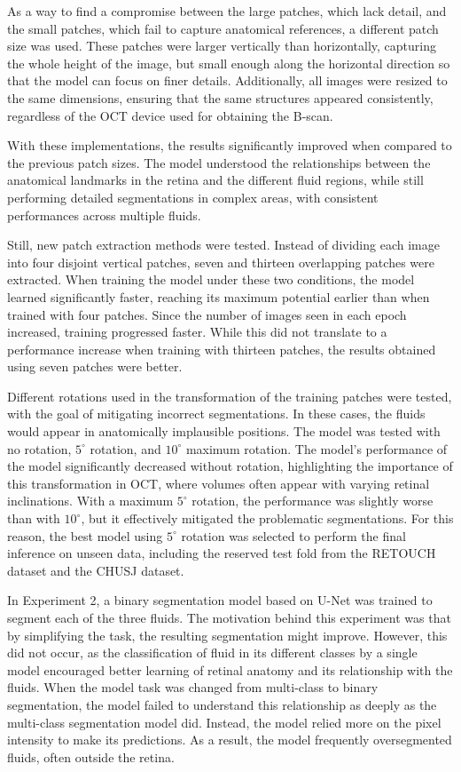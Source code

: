 \par
As a way to find a compromise between the large patches, which lack detail, and the small patches, which fail to capture anatomical references, a different patch size was used. These patches were larger vertically than horizontally, capturing the whole height of the image, but small enough along the horizontal direction so that the model can focus on finer details. Additionally, all images were resized to the same dimensions, ensuring that the same structures appeared consistently, regardless of the OCT device used for obtaining the B-scan.
\par
With these implementations, the results significantly improved when compared to the previous patch sizes. The model understood the relationships between the anatomical landmarks in the retina and the different fluid regions, while still performing detailed segmentations in complex areas, with consistent performances across multiple fluids.
\par
Still, new patch extraction methods were tested. Instead of dividing each image into four disjoint vertical patches, seven and thirteen overlapping patches were extracted. When training the model under these two conditions, the model learned significantly faster, reaching its maximum potential earlier than when trained with four patches. Since the number of images seen in each epoch increased, training progressed faster. While this did not translate to a performance increase when training with thirteen patches, the results obtained using seven patches were better.
\par
Different rotations used in the transformation of the training patches were tested, with the goal of mitigating incorrect segmentations. In these cases, the fluids would appear in anatomically implausible positions. The model was tested with no rotation, $5^{\circ}$ rotation, and $10^{\circ}$ maximum rotation. The model's performance of the model significantly decreased without rotation, highlighting the importance of this transformation in OCT, where volumes often appear with varying retinal inclinations. With a maximum $5^{\circ}$ rotation, the performance was slightly worse than with $10^{\circ}$, but it effectively mitigated the problematic segmentations. For this reason, the best model using $5^{\circ}$ rotation was selected to perform the final inference on unseen data, including the reserved test fold from the RETOUCH dataset and the CHUSJ dataset.
\par
In Experiment 2, a binary segmentation model based on U-Net was trained to segment each of the three fluids. The motivation behind this experiment was that by simplifying the task, the resulting segmentation might improve. However, this did not occur, as the classification of fluid in its different classes by a single model encouraged better learning of retinal anatomy and its relationship with the fluids. When the model task was changed from multi-class to binary segmentation, the model failed to understand this relationship as deeply as the multi-class segmentation model did. Instead, the model relied more on the pixel intensity to make its predictions. As a result, the model frequently oversegmented fluids, often outside the retina.

